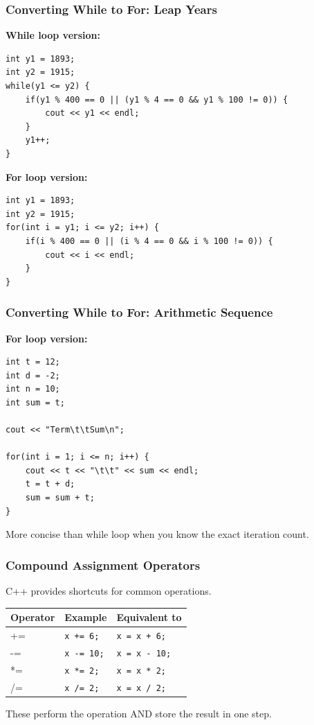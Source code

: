 \documentclass{beamer}
\begin{document}
\begin{frame}[fragile]
\frametitle{Converting While to For: Leap Years}
\textbf{While loop version:}
\begin{verbatim}
int y1 = 1893;
int y2 = 1915;
while(y1 <= y2) {
    if(y1 % 400 == 0 || (y1 % 4 == 0 && y1 % 100 != 0)) {
        cout << y1 << endl;
    }
    y1++;
}
\end{verbatim}
\pause

\textbf{For loop version:}
\begin{verbatim}
int y1 = 1893;
int y2 = 1915;
for(int i = y1; i <= y2; i++) {
    if(i % 400 == 0 || (i % 4 == 0 && i % 100 != 0)) {
        cout << i << endl;
    }
}
\end{verbatim}
\end{frame}

\begin{frame}[fragile]
\frametitle{Converting While to For: Arithmetic Sequence}
\textbf{For loop version:}
\begin{verbatim}
int t = 12;
int d = -2;
int n = 10;
int sum = t;

cout << "Term\t\tSum\n";

for(int i = 1; i <= n; i++) {
    cout << t << "\t\t" << sum << endl; 
    t = t + d;
    sum = sum + t;
}
\end{verbatim}

More concise than while loop when you know the exact iteration count.
\end{frame}

\begin{frame}
\frametitle{Compound Assignment Operators}
C++ provides shortcuts for common operations.\pause

\begin{center}
\begin{tabular}{|l|l|l|}
\hline
\textbf{Operator} & \textbf{Example} & \textbf{Equivalent to} \\
\hline
+= & \texttt{x += 6;} & \texttt{x = x + 6;} \\
\hline
-= & \texttt{x -= 10;} & \texttt{x = x - 10;} \\
\hline
*= & \texttt{x *= 2;} & \texttt{x = x * 2;} \\
\hline
/= & \texttt{x /= 2;} & \texttt{x = x / 2;} \\
\hline
\end{tabular}
\end{center}
\pause

These perform the operation AND store the result in one step.
\end{frame}
\end{document}
